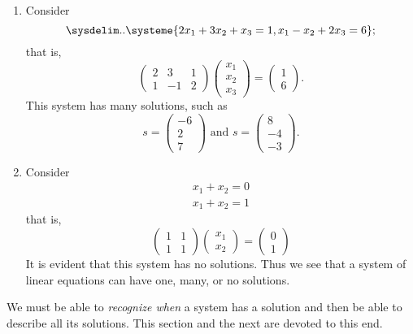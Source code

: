 \begin{example}
\begin{enumerate}
\item Consider
\[
    \sysdelim..\systeme{
        2 x_1 + 3 x_2 + x_3 = 1,
        x_1 - x_2 + 2 x_3 = 6
    };
\]
that is,
\[
    \left(\begin{array}{rrr} 2 & 3 & 1 \\ 1 & -1 & 2 \end{array}\right)
    \left(\begin{array}{l} x_1 \\ x_2 \\ x_3 \end{array}\right)
    = \left(\begin{array}{l} 1 \\ 6 \end{array}\right).
\]
This system has many solutions, such as
\[
    s = \left(\begin{array}{r} -6 \\ 2 \\ 7 \end{array}\right)
    \text { and }
    s = \left(\begin{array}{r} 8 \\ -4 \\ -3 \end{array}\right).
\]

\item Consider
\[
    \begin{array}{l} x_{1}+x_{2}=0 \\ x_{1}+x_{2}=1 \end{array}
\]
that is,
\[
    \left(\begin{array}{ll} 1 & 1 \\ 1 & 1 \end{array}\right)
    \left(\begin{array}{l} x_{1} \\ x_{2} \end{array}\right)
    = \left(\begin{array}{l} 0 \\ 1 \end{array}\right)
\]
It is evident that this system has no solutions.
Thus we see that a system of linear equations can have one, many, or no solutions.
\end{enumerate}
\end{example}

We must be able to \emph{recognize when} a system has a solution and then be able to describe all its solutions.
This section and the next are devoted to this end.

